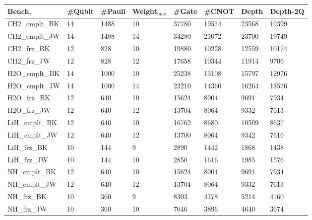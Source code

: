 \begin{tabular}{llllllll}
    \toprule
    Bench. & \#Qubit & \#Pauli & Weight$_{\max}$ & \#Gate & \#CNOT  & Depth & Depth-2Q \\
    \midrule
    CH2\_cmplt\_BK & 14 & 1488 & 10 & 37780 & 19574 & 23568 & 19399 \\
    CH2\_cmplt\_JW & 14 & 1488 & 14 & 34280 & 21072 & 23700 & 19749 \\
    CH2\_frz\_BK & 12 & 828 & 10 & 19880 & 10228 & 12559 & 10174 \\
    CH2\_frz\_JW & 12 & 828 & 12 & 17658 & 10344 & 11914 & 9706 \\
    H2O\_cmplt\_BK & 14 & 1000 & 10 & 25238 & 13108 & 15797 & 12976 \\
    H2O\_cmplt\_JW & 14 & 1000 & 14 & 23210 & 14360 & 16264 & 13576 \\
    H2O\_frz\_BK & 12 & 640 & 10 & 15624 & 8004 & 9691 & 7934 \\
    H2O\_frz\_JW & 12 & 640 & 12 & 13704 & 8064 & 9332 & 7613 \\
    LiH\_cmplt\_BK & 12 & 640 & 10 & 16762 & 8680 & 10509 & 8637 \\
    LiH\_cmplt\_JW & 12 & 640 & 12 & 13700 & 8064 & 9342 & 7616 \\
    LiH\_frz\_BK & 10 & 144 & 9 & 2890 & 1442 & 1868 & 1438 \\
    LiH\_frz\_JW & 10 & 144 & 10 & 2850 & 1616 & 1985 & 1576 \\
    NH\_cmplt\_BK & 12 & 640 & 10 & 15624 & 8004 & 9691 & 7934 \\
    NH\_cmplt\_JW & 12 & 640 & 12 & 13704 & 8064 & 9332 & 7613 \\
    NH\_frz\_BK & 10 & 360 & 9 & 8303 & 4178 & 5214 & 4160 \\
    NH\_frz\_JW & 10 & 360 & 10 & 7046 & 3896 & 4640 & 3674 \\
    \bottomrule
\end{tabular}
    
